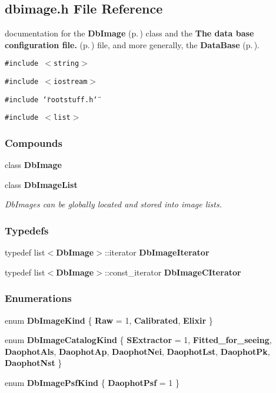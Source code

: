 \subsection{dbimage.h File Reference}
\label{dbimage_h}
documentation for the {\bf Db\-Image} {\rm (p.\,\pageref{class_dbimage})} class and the {\bf The data base configuration file.} {\rm (p.\,\pageref{dbconfig})} file, and more generally, the {\bf Data\-Base} {\rm (p.\,\pageref{database_page})}. 


{\tt \#include $<$string$>$}\par
{\tt \#include $<$iostream$>$}\par
{\tt \#include \char`\"{}rootstuff.h\char`\"{}}\par
{\tt \#include $<$list$>$}\par
\subsubsection*{Compounds}
\begin{CompactItemize}
\item 
class {\bf Db\-Image}
\item 
class {\bf Db\-Image\-List}
\begin{CompactList}\small\item\em Db\-Images can be globally located and stored into image lists.\item\end{CompactList}\end{CompactItemize}
\subsubsection*{Typedefs}
\begin{CompactItemize}
\item 
{}
typedef list$<${\bf Db\-Image}$>$::iterator {\bf Db\-Image\-Iterator}\label{dbimage_h_a0}

\item 
{}
typedef list$<${\bf Db\-Image}$>$::const\_\-iterator {\bf Db\-Image\-CIterator}\label{dbimage_h_a1}

\end{CompactItemize}
\subsubsection*{Enumerations}
\begin{CompactItemize}
\item 
enum {\bf Db\-Image\-Kind} \{ {\bf Raw} =  1, 
{\bf Calibrated}, 
{\bf Elixir}
 \}
\item 
enum {\bf Db\-Image\-Catalog\-Kind} \{ {\bf SExtractor} =  1, 
{\bf Fitted\_\-for\_\-seeing}, 
{\bf Daophot\-Als}, 
{\bf Daophot\-Ap}, 
{\bf Daophot\-Nei}, 
{\bf Daophot\-Lst}, 
{\bf Daophot\-Pk}, 
{\bf Daophot\-Nst}
 \}
\item 
enum {\bf Db\-Image\-Psf\-Kind} \{ {\bf Daophot\-Psf} =  1
 \}
\end{CompactItemize}

